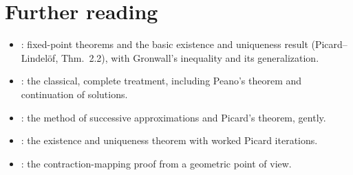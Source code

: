\section{Further reading}\label{sec:ch08-reading}

\begin{itemize}
  \item \textcite[\S\S2.1--2.2]{Teschl}: fixed-point theorems and the basic
        existence and uniqueness result (Picard--Lindel\"of, Thm.~2.2), with
        Gronwall's inequality and its generalization.
  \item \textcite[Ch.~1]{CoddingtonLevinson}: the classical, complete
        treatment, including Peano's theorem and continuation of solutions.
  \item \textcite[Ch.~13, \S\S69--70]{Simmons}: the method of successive
        approximations and Picard's theorem, gently.
  \item \textcite[\S2.8]{BoyceDiPrima}: the existence and uniqueness theorem
        with worked Picard iterations.
  \item \textcite[Ch.~4]{Arnold}: the contraction-mapping proof from a
        geometric point of view.
\end{itemize}
